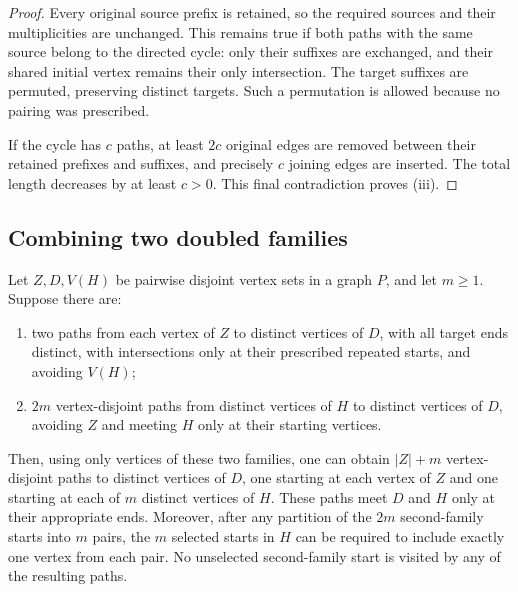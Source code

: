 \begin{proof}
Every original source prefix is retained, so the required sources and
their multiplicities are unchanged.  This remains true if both paths
with the same source belong to the directed cycle: only their suffixes
are exchanged, and their shared initial vertex remains their only
intersection.  The target suffixes are permuted, preserving distinct
targets.  Such a permutation is allowed because no pairing was prescribed.

If the cycle has $c$ paths, at least $2c$ original edges are removed
between their retained prefixes and suffixes, and precisely $c$ joining
edges are inserted.  The total length decreases by at least $c>0$.
This final contradiction proves (iii).
\end{proof}

\subsection{Combining two doubled families}

\begin{lemma}
\label{lem:combine}
Let $Z,D,V(H)$ be pairwise disjoint vertex sets in a graph $P$, and let
$m\ge1$.  Suppose there are:
\begin{enumerate}[label=(\roman*)]
\item two paths from each vertex of $Z$ to distinct vertices of $D$,
      with all target ends distinct, with intersections only at their
      prescribed repeated starts, and avoiding $V(H)$;
\item $2m$ vertex-disjoint paths from distinct vertices of $H$ to
      distinct vertices of $D$, avoiding $Z$ and meeting $H$ only at
      their starting vertices.
\end{enumerate}
Then, using only vertices of these two families, one can obtain
$|Z|+m$ vertex-disjoint paths to distinct vertices of $D$, one starting
at each vertex of $Z$ and one starting at each of $m$ distinct vertices
of $H$.  These paths meet $D$ and $H$ only at their appropriate ends.
Moreover, after any partition of the $2m$ second-family starts into $m$
pairs, the $m$ selected starts in $H$ can be required to include exactly
one vertex from each pair.  No unselected second-family start is visited
by any of the resulting paths.
\end{lemma}


